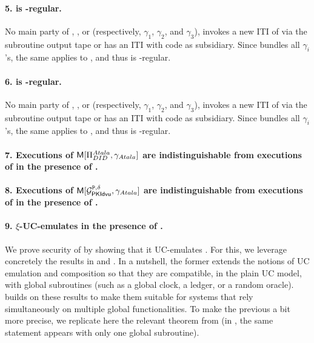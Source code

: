 \paragraph{5. \gAtala is \RealPKIDIDAtala-regular.} No main party of
\IdealGdledger, \IdealGRO, or \IdealGclock (respectively, $\gamma_1$,
$\gamma_2$, and $\gamma_3$), invokes a new ITI of \RealPKIDIDAtala via the
subroutine output tape or has an ITI with code \RealPKIDIDAtala as subsidiary.
Since \gAtala bundles all $\gamma_i$'s, the same applies to \gAtala, and
thus \gAtala is \RealPKIDIDAtala-regular.

\paragraph{6. \gAtala is \IdealGPKIDID-regular.} No main party of
\IdealGdledger, \IdealGRO, or \IdealGclock (respectively, $\gamma_1$,
$\gamma_2$, and $\gamma_3$), invokes a new ITI of \IdealGPKIDID via the
subroutine output tape or has an ITI with code \IdealGPKIDID as subsidiary.
Since \gAtala bundles all $\gamma_i$'s, the same applies to \gAtala, and
thus \gAtala is \IdealGPKIDID-regular.

\paragraph{7. Executions of $\mathsf{M}[\Pi_{DID}^{Atala},\gamma_{Atala}]$ are
  indistinguishable from executions of \RealPKIDIDAtala in the presence of
  \gAtala.}

\paragraph{8. Executions of $\mathsf{M}[\mathcal{G}^{\mathtt{P},\delta}_{\mathsf{PKIdvu}},\gamma_{Atala}]$ are indistinguishable
  from executions of \IdealGPKIDID in the presence of \gAtala.}

\paragraph{9. \RealPKIDIDAtala $\xi$-UC-emulates \IdealGPKIDID in the presence
  of \gAtala.}


We prove security of \RealPKIDIDAtala by showing that it UC-emulates
\IdealGPKIDID. For this, we leverage concretely the results in \cite{bch+20} and
\cite{bhz21}. In a nutshell, the former extends the notions of UC emulation and
composition so that they are compatible, in the plain UC model, with global
subroutines (such as a global clock, a ledger, or a random oracle).
\cite{bhz21} builds on these results to make them suitable for systems that rely
simultaneously on multiple global functionalities.
%
To make the previous a bit more precise, we replicate here the relevant theorem
from \cite{bhz21} (in \cite{bch+20}, the same statement appears with only one
global subroutine).

